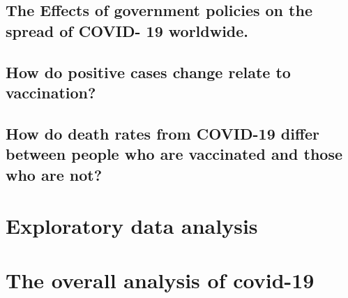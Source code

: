 \documentclass[11pt,a4paper,]{article}
\begin{document}
\hypertarget{the-effects-of-government-policies-on-the-spread-of-covid--19-worldwide.}{%
\subsection{\texorpdfstring{\textbf{The Effects of government policies on the spread of COVID- 19 worldwide.}}{The Effects of government policies on the spread of COVID- 19 worldwide.}}\label{the-effects-of-government-policies-on-the-spread-of-covid--19-worldwide.}}

\hypertarget{how-do-positive-cases-change-relate-to-vaccination}{%
\subsection{\texorpdfstring{\textbf{How do positive cases change relate to vaccination?}}{How do positive cases change relate to vaccination?}}\label{how-do-positive-cases-change-relate-to-vaccination}}

\hypertarget{how-do-death-rates-from-covid-19-differ-between-people-who-are-vaccinated-and-those-who-are-not}{%
\subsection{\texorpdfstring{\textbf{How do death rates from COVID-19 differ between people who are vaccinated and those who are not?}}{How do death rates from COVID-19 differ between people who are vaccinated and those who are not?}}\label{how-do-death-rates-from-covid-19-differ-between-people-who-are-vaccinated-and-those-who-are-not}}

\clearpage

\hypertarget{exploratory-data-analysis}{%
\section{\texorpdfstring{\textbf{Exploratory data analysis}}{Exploratory data analysis}}\label{exploratory-data-analysis}}

\section*{The overall analysis of covid-19}
\end{document}
